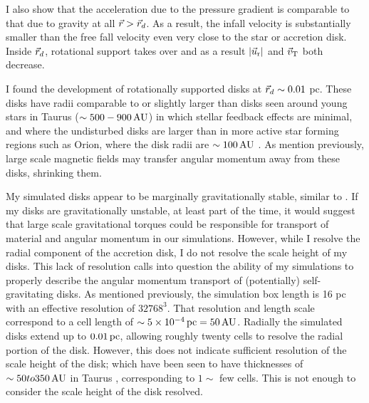 \documentclass[../dissertation.tex]{subfiles}
\begin{document}
I also show that the acceleration due to the pressure gradient is comparable to that due to gravity at all $\vec{r} > \vec{r}_d$. 
As a result, the infall velocity is substantially smaller than the free fall velocity
even very close to the star or accretion disk. 
Inside $\vec{r}_d$, rotational support takes over and as a result $|\vec{u}_{ \rm r}|$ and $\vec{v}_{\rm T}$ both decrease.  

I found the development of rotationally supported disks at $\vec{r}_d \sim 0.01$ pc.  
These disks have radii comparable to or slightly larger than disks seen around 
young stars in Taurus ($\sim 500 - 900 \,\rm AU$) \citep{1999AJ....117.1490P} in which stellar feedback effects are minimal,
and where the undisturbed disks are larger than in more active star forming regions such as Orion, 
where the disk radii are $\sim 100\,\rm AU$ \citep{2011ARA&A..49...67W}. 
As mention previously, large scale magnetic fields may transfer angular 
momentum away from these disks, shrinking them.  

My simulated disks appear to be marginally gravitationally stable, similar to \citet{2010ApJ...708.1585K}. 
If my disks are gravitationally unstable, at least part of the time, it would suggest 
that large scale gravitational torques could be responsible for 
transport of material and angular momentum in our simulations.
However, while I resolve the radial component of the accretion disk, I do not resolve the scale height of my disks. 
This lack of resolution calls 
into question the ability of my simulations to properly describe the 
angular momentum transport of (potentially) self-gravitating disks. 
As mentioned previously, the simulation box length is 16 pc with an effective resolution of $32768^3$. 
That resolution and length scale correspond to a cell length of $\sim 5 \times 10^{-4} \,\rm pc = 50 \, {\rm AU}$. 
Radially the simulated disks extend up to $0.01 \,\rm pc$, allowing roughly twenty cells to resolve the radial portion of the disk. 
However, this does not indicate sufficient resolution of the scale height of the disk; which have been seen to have thicknesses of 
$\sim 50 to 350 \, {\rm AU}$ in Taurus \citep{1999AJ....117.1490P}, corresponding to $1 \sim $ few cells. 
This is not enough to consider the scale height of the disk resolved. 
\end{document}
